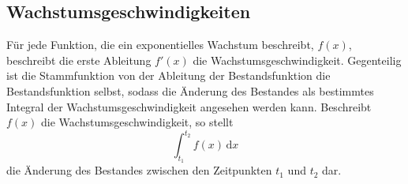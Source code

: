 \documentclass{article}
\begin{document}
\subsection{Wachstumsgeschwindigkeiten}
Für jede Funktion, die ein exponentielles Wachstum beschreibt, $f(x)$, beschreibt die erste Ableitung $f'(x)$ die Wachstumsgeschwindigkeit. \newline
Gegenteilig ist die Stammfunktion von der Ableitung der Bestandsfunktion die Bestandsfunktion selbst, sodass die Änderung des Bestandes als bestimmtes Integral der Wachstumsgeschwindigkeit angesehen werden kann. Beschreibt $f(x)$ die Wachstumsgeschwindigkeit, so stellt
\[
 \int_{t_1}^{t_2} f(x) \,\mathrm{d}x 
\]
die Änderung des Bestandes zwischen den Zeitpunkten $t_1$ und $t_2$ dar. 
 
\end{document}
